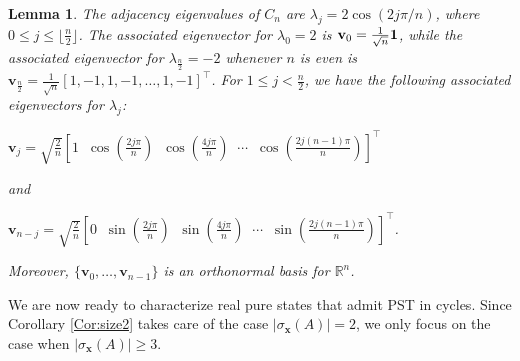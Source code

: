 \documentclass[11pt]{article}
\newtheorem{lemma}[theorem]{Lemma}
\newcommand{\ones}{{\bf{1}}}
\newcommand{\bv}{\mathbf v}
\newcommand{\bx}{\mathbf x}
\def\R{\mathbb{R}}
\begin{document}
\begin{lemma}
\label{Lem:cneval}
The adjacency eigenvalues of $C_n$ are $\lambda_j=2\cos(2j\pi/n)$, where $0\leq j\leq \lfloor\frac{n}{2}\rfloor$. The associated eigenvector for $\lambda_0=2$ is $\bv_0=\frac{1}{\sqrt{n}}\ones$, while the associated eigenvector for $\lambda_{\frac{n}{2}}=-2$ whenever $n$ is even is $\bv_{\frac{n}{2}}=\frac{1}{\sqrt{n}}[1,-1,1,-1,\ldots,1,-1]^\top$. For $1\leq j<\frac{n}{2}$, we have the following associated eigenvectors for $\lambda_j$:
\begin{center}
$\bv_j=\sqrt{\frac{2}{n}}\left[1\;\; \cos\left(\frac{2j\pi}{n}\right)\;\; \cos\left(\frac{4j\pi}{n}\right)\;\; \cdots\;\; \cos\left(\frac{2j(n-1)\pi}{n}\right)\right]^\top$
\end{center}
and
\begin{center}
$\bv_{n-j}=\sqrt{\frac{2}{n}}\left[0\;\; \sin\left(\frac{2j\pi}{n}\right)\;\; \sin\left(\frac{4j\pi}{n}\right)\;\; \cdots\;\; \sin\left(\frac{2j(n-1)\pi}{n}\right)\right]^\top$.
\end{center}
Moreover, $\{\bv_0,\ldots,\bv_{n-1}\}$ is an orthonormal basis for $\R^n$.
\end{lemma}

We are now ready to characterize real pure states that admit PST in cycles. Since Corollary \ref{Cor:size2} takes care of the case $|\sigma_{\bx}(A)|=2$, we only focus on the case when $|\sigma_{\bx}(A)|\geq 3$.
\end{document}
